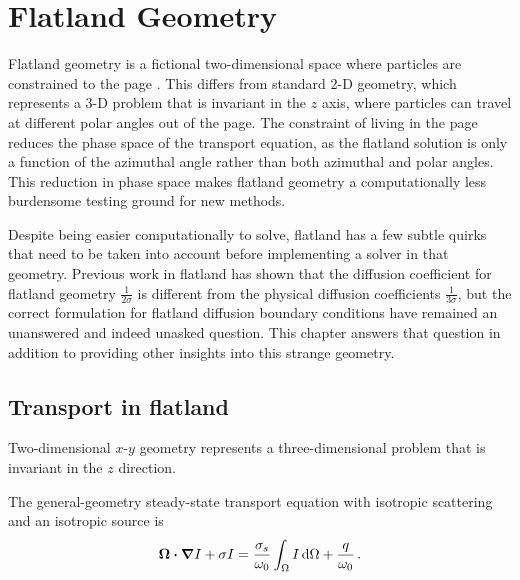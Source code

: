 
\chapter{Flatland Geometry}

Flatland geometry is a fictional two-dimensional space where particles are
constrained to the page \cite{Abb1884,Asa2008}. This differs from standard 2-D
geometry, which represents a 3-D problem that is invariant in the $z$ axis,
where particles can travel at different polar angles out of the page. The
constraint of living in the page reduces the phase space of the transport
equation, as the flatland solution is only a function of the azimuthal angle
rather than both azimuthal and polar angles. This reduction in phase space makes 
flatland geometry a computationally less burdensome testing ground for new
methods.

Despite being easier computationally to solve, flatland has a few subtle quirks
that need to be taken into account before implementing a solver in that
geometry. Previous work in flatland \cite{Asa2008,Lar2009c} has shown that the
diffusion coefficient for flatland geometry $\frac{1}{2\sigma}$ is different from
the physical diffusion coefficients $\frac{1}{3\sigma}$, but the correct
formulation for flatland diffusion boundary
conditions have remained an unanswered and indeed unasked question. This
chapter answers that question in addition to providing other insights into this
strange geometry.

\section{Transport in flatland}

Two-dimensional $x$-$y$ geometry represents a three-dimensional problem that is
invariant in the $z$ direction. 

The general-geometry steady-state transport equation with isotropic scattering
and an isotropic source is
\begin{equation}\label{eq:generalTransport}
  \bm{\Omega}\bm{\cdot} \bm{\nabla} I + \sigma I
  = \frac{\sigma_s}{\omega_0} \int_{\Omega} I \mathop{}\!\mathrm{d}\Omega + \frac{q}{\omega_0} \,.
\end{equation}

